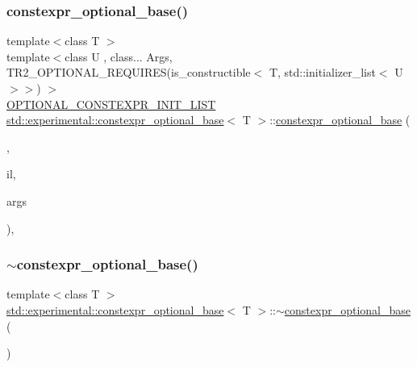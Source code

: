\subsubsection{\texorpdfstring{constexpr\+\_\+optional\+\_\+base()}{constexpr\_optional\_base()}\hspace{0.1cm}{\footnotesize\ttfamily [5/5]}}
{\footnotesize\ttfamily template$<$class T $>$ \\
template$<$class U , class... Args, T\+R2\+\_\+\+O\+P\+T\+I\+O\+N\+A\+L\+\_\+\+R\+E\+Q\+U\+I\+R\+E\+S(is\+\_\+constructible$<$ T, std\+::initializer\+\_\+list$<$ U $>$$>$) $>$ \\
\hyperlink{optional_8h_a7399114ed1c146a67741cdd1f681fcb5}{O\+P\+T\+I\+O\+N\+A\+L\+\_\+\+C\+O\+N\+S\+T\+E\+X\+P\+R\+\_\+\+I\+N\+I\+T\+\_\+\+L\+I\+ST} \hyperlink{structstd_1_1experimental_1_1constexpr__optional__base}{std\+::experimental\+::constexpr\+\_\+optional\+\_\+base}$<$ T $>$\+::\hyperlink{structstd_1_1experimental_1_1constexpr__optional__base}{constexpr\+\_\+optional\+\_\+base} (\begin{DoxyParamCaption}\item[{\hyperlink{structstd_1_1experimental_1_1in__place__t}{in\+\_\+place\+\_\+t}}]{,  }\item[{std\+::initializer\+\_\+list$<$ U $>$}]{il,  }\item[{Args \&\&...}]{args }\end{DoxyParamCaption})\hspace{0.3cm}{\ttfamily [inline]}, {\ttfamily [explicit]}}

\mbox{\label{structstd_1_1experimental_1_1constexpr__optional__base_aa45afb4ed80eab963e850ca337956a95}} 
\subsubsection{\texorpdfstring{$\sim$constexpr\+\_\+optional\+\_\+base()}{~constexpr\_optional\_base()}}
{\footnotesize\ttfamily template$<$class T $>$ \\
\hyperlink{structstd_1_1experimental_1_1constexpr__optional__base}{std\+::experimental\+::constexpr\+\_\+optional\+\_\+base}$<$ T $>$\+::$\sim$\hyperlink{structstd_1_1experimental_1_1constexpr__optional__base}{constexpr\+\_\+optional\+\_\+base} (\begin{DoxyParamCaption}{ }\end{DoxyParamCaption})\hspace{0.3cm}{\ttfamily [default]}}



